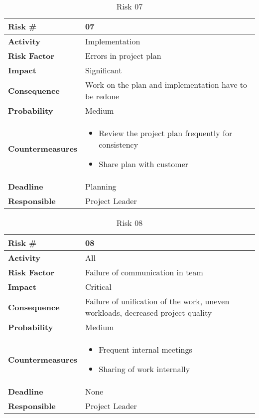 \medskip

\begin{table}
\begin{tabularx}{\textwidth}{ | l | X | }
\hline
\textbf{Risk \#} & 07 \\ \hline
\textbf{Activity} & Implementation \\ \hline
\textbf{Risk Factor} & Errors in project plan \\ \hline
\textbf{Impact} & Significant \\ \hline
\textbf{Consequence} & Work on the plan and implementation have to be redone  \\ \hline
\textbf{Probability} & Medium \\ \hline
\textbf{Countermeasures} & \begin{itemize}
  \item Review the project plan frequently for consistency
  \item Share plan with customer
\end{itemize}  \\ \hline
\textbf{Deadline} &  Planning \\ \hline
\textbf{Responsible} & Project Leader \\ \hline
\end{tabularx}
\caption{Risk 07}
\end{table}

\medskip

\begin{table}
\begin{tabularx}{\textwidth}{ | l | X | }
\hline
\textbf{Risk \#} & 08 \\ \hline
\textbf{Activity} & All \\ \hline
\textbf{Risk Factor} & Failure of communication in team \\ \hline
\textbf{Impact} & Critical \\ \hline
\textbf{Consequence} & Failure of unification of the work, uneven workloads, decreased project quality  \\ \hline
\textbf{Probability} & Medium \\ \hline
\textbf{Countermeasures} & \begin{itemize}
  \item Frequent internal meetings
  \item Sharing of work internally
\end{itemize}  \\ \hline
\textbf{Deadline} &  None \\ \hline
\textbf{Responsible} & Project Leader \\ \hline
\end{tabularx}
\caption{Risk 08}
\end{table}

